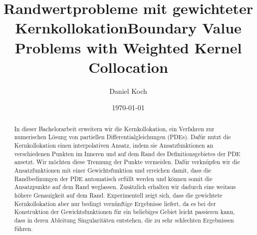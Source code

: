 \documentclass[%
  bachelor,%
  draft,%
  english,%
  ngerman,%
  male,%
]{iswstud}
\author{Daniel Koch}
\date{\today}
\title{Randwertprobleme mit gewichteter Kernkollokation}
\theoremstyle{plain}
\theoremstyle{definition}
\theoremstyle{definition}
\theoremstyle{remark}
\begin{document}
\frontmatter

\maketitle



\begin{otherlanguage}{english}
  \title{Boundary Value Problems with Weighted Kernel Collocation}
  \shorttitle{}
  \subtitle{}

  \maketitle
\end{otherlanguage}



\begin{abstract}
  In dieser Bachelorarbeit erweitern wir die Kernkollokation, ein Verfahren zur numerischen Lösung von partiellen Differentialgleichungen (\acs{PDE}s). Dafür nutzt die Kernkollokation einen interpolativen Ansatz, indem sie Ansatzfunktionen an verschiedenen Punkten im Inneren und auf dem Rand des Definitionsgebietes der \ac{PDE} ansetzt. Wir möchten diese Trennung der Punkte vermeiden. Dafür verknüpfen wir die Ansatzfunktionen mit einer Gewichtsfunktion und erreichen damit, dass die Randbedinungen der \ac{PDE} automatisch erfüllt werden und können somit die Ansatzpunkte auf dem Rand weglassen. Zusätzlich erhalten wir dadurch eine weitaus höhere Genauigkeit auf dem Rand. Experimentell zeigt sich, dass die gewichtete Kernkollokation aber nur bedingt vernünftige Ergebnisse liefert, da es bei der Konstruktion der Gewichtsfunktionen für ein beliebiges Gebiet leicht passieren kann, dass in deren Ableitung Singularitäten entstehen, die zu sehr schlechten Ergebnissen führen.
\end{abstract}
\end{document}
